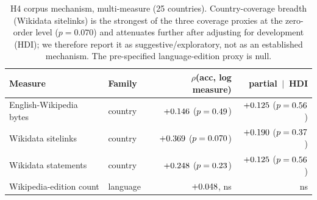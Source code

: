 \documentclass[11pt,a4paper]{article}
\begin{document}
\begin{table}[h]\centering
\caption{H4 corpus mechanism, multi-measure (25 countries). Country-coverage
breadth (Wikidata sitelinks) is the strongest of the three coverage proxies at
the zero-order level ($p=0.070$) and attenuates further after adjusting for
development (HDI); we therefore report it as suggestive/exploratory, not as an
established mechanism. The pre-specified
language-edition proxy is null.}
\label{tab:s-h4}
\small
\begin{tabular}{llrr}
\toprule
Measure & Family & $\rho$(acc, log measure) & partial $\,\vert\,$ HDI \\
\midrule
English-Wikipedia bytes      & country  & $+0.146$ ($p=0.49$) & $+0.125$ ($p=0.56$) \\
Wikidata sitelinks  & country  & $+0.369$ ($p=0.070$) & $+0.190$ ($p=0.37$) \\
Wikidata statements          & country  & $+0.248$ ($p=0.23$) & $+0.125$ ($p=0.56$) \\
Wikipedia-edition count      & language & $+0.048$, ns        & ns \\
\bottomrule
\end{tabular}
\end{table}
\end{document}
